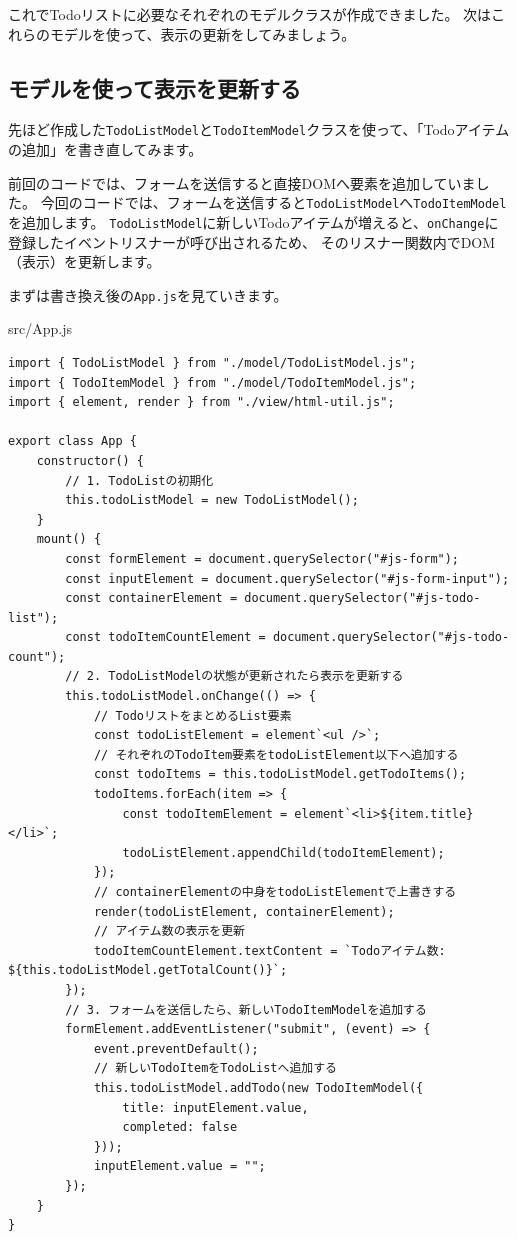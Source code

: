 これでTodoリストに必要なそれぞれのモデルクラスが作成できました。
次はこれらのモデルを使って、表示の更新をしてみましょう。

\hypertarget{model-update-view}{%
\subsection{モデルを使って表示を更新する}\label{model-update-view}}

先ほど作成した\texttt{TodoListModel}と\texttt{TodoItemModel}クラスを使って、「Todoアイテムの追加」を書き直してみます。

前回のコードでは、フォームを送信すると直接DOMへ要素を追加していました。
今回のコードでは、フォームを送信すると\texttt{TodoListModel}へ\texttt{TodoItemModel}を追加します。
\texttt{TodoListModel}に新しいTodoアイテムが増えると、\texttt{onChange}に登録したイベントリスナーが呼び出されるため、
そのリスナー関数内でDOM（表示）を更新します。

まずは書き換え後の\texttt{App.js}を見ていきます。

\begin{listtitle}
src/App.js
\end{listtitle}
\begin{lstlisting}
import { TodoListModel } from "./model/TodoListModel.js";
import { TodoItemModel } from "./model/TodoItemModel.js";
import { element, render } from "./view/html-util.js";

export class App {
    constructor() {
        // 1. TodoListの初期化
        this.todoListModel = new TodoListModel();
    }
    mount() {
        const formElement = document.querySelector("#js-form");
        const inputElement = document.querySelector("#js-form-input");
        const containerElement = document.querySelector("#js-todo-list");
        const todoItemCountElement = document.querySelector("#js-todo-count");
        // 2. TodoListModelの状態が更新されたら表示を更新する
        this.todoListModel.onChange(() => {
            // TodoリストをまとめるList要素
            const todoListElement = element`<ul />`;
            // それぞれのTodoItem要素をtodoListElement以下へ追加する
            const todoItems = this.todoListModel.getTodoItems();
            todoItems.forEach(item => {
                const todoItemElement = element`<li>${item.title}</li>`;
                todoListElement.appendChild(todoItemElement);
            });
            // containerElementの中身をtodoListElementで上書きする
            render(todoListElement, containerElement);
            // アイテム数の表示を更新
            todoItemCountElement.textContent = `Todoアイテム数: ${this.todoListModel.getTotalCount()}`;
        });
        // 3. フォームを送信したら、新しいTodoItemModelを追加する
        formElement.addEventListener("submit", (event) => {
            event.preventDefault();
            // 新しいTodoItemをTodoListへ追加する
            this.todoListModel.addTodo(new TodoItemModel({
                title: inputElement.value,
                completed: false
            }));
            inputElement.value = "";
        });
    }
}
\end{lstlisting}
\listend

